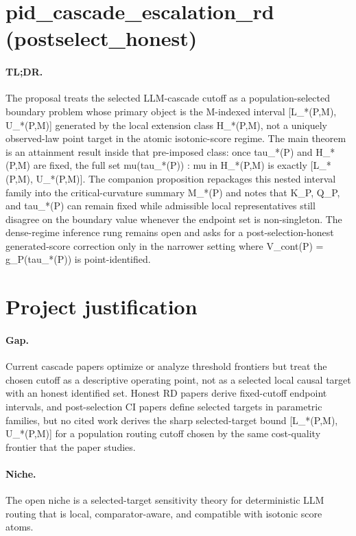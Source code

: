 \documentclass{article}
\begin{document}
\section*{pid_cascade_escalation_rd (postselect_honest)}

\paragraph{TL;DR.} The proposal treats the selected LLM-cascade cutoff as a population-selected boundary problem whose primary object is the M-indexed interval [L_*(P,M), U_*(P,M)] generated by the local extension class H_*(P,M), not a uniquely observed-law point target in the atomic isotonic-score regime. The main theorem is an attainment result inside that pre-imposed class: once tau_*(P) and H_*(P,M) are fixed, the full set {mu(tau_*(P)) : mu in H_*(P,M)} is exactly [L_*(P,M), U_*(P,M)]. The companion proposition repackages this nested interval family into the critical-curvature summary M_*(P) and notes that K_P, Q_P, and tau_*(P) can remain fixed while admissible local representatives still disagree on the boundary value whenever the endpoint set is non-singleton. The dense-regime inference rung remains open and asks for a post-selection-honest generated-score correction only in the narrower setting where V_cont(P) = g_P(tau_*(P)) is point-identified.

\section{Project justification}

\paragraph{Gap.} Current cascade papers optimize or analyze threshold frontiers but treat the chosen cutoff as a descriptive operating point, not as a selected local causal target with an honest identified set. Honest RD papers derive fixed-cutoff endpoint intervals, and post-selection CI papers define selected targets in parametric families, but no cited work derives the sharp selected-target bound [L_*(P,M), U_*(P,M)] for a population routing cutoff chosen by the same cost-quality frontier that the paper studies.

\paragraph{Niche.} The open niche is a selected-target sensitivity theory for deterministic LLM routing that is local, comparator-aware, and compatible with isotonic score atoms.
\end{document}
